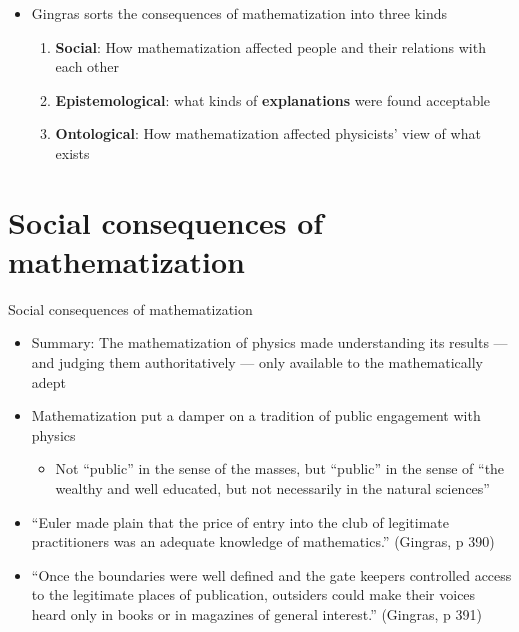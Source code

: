 \documentclass[fleqn]{beamer}
\newcommand{\kw}[1]{\textbf{#1}}
\begin{document}
\begin{frame}

  \begin{itemize}
  \item Gingras sorts the consequences of mathematization into three
    kinds
    \begin{enumerate}
    \item \kw{Social}: How mathematization affected people and their
      relations with each other
    \item \kw{Epistemological}: what kinds of \kw{explanations} were
      found acceptable
    \item \kw{Ontological}: How mathematization affected physicists'
      view of what exists
    \end{enumerate}
  \end{itemize}

\end{frame}

\section{Social consequences of mathematization}

\begin{frame}{Social consequences of mathematization}

  \begin{itemize}
  \item Summary: The mathematization of physics made understanding its
    results --- and judging them authoritatively --- only available to
    the mathematically adept
  \item Mathematization put a damper on a tradition of public
    engagement with physics
    \begin{itemize}
    \item Not ``public'' in the sense of the masses, but ``public'' in
      the sense of ``the wealthy and well educated, but not
      necessarily in the natural sciences''
    \end{itemize}
  \end{itemize}

\end{frame}

\begin{frame}

  \begin{itemize}
  \item ``Euler made plain that the price of entry into the club of
    legitimate practitioners was an adequate knowledge of
    mathematics.'' (Gingras, p 390)
  \item ``Once the boundaries were well defined and the gate keepers
    controlled access to the legitimate places of publication,
    outsiders could make their voices heard only in books or in
    magazines of general interest.'' (Gingras, p 391)
  \end{itemize}

\end{frame}
\end{document}
